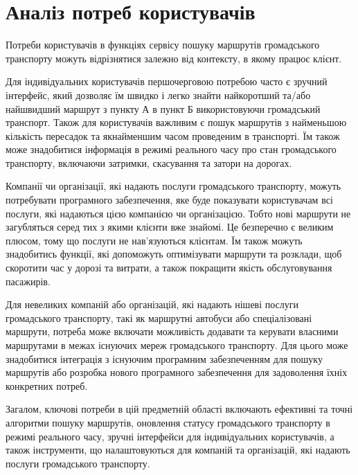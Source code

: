 \section{Аналіз потреб користувачів}
\label{sec:clients-analysis}

Потреби користувачів в функціях сервісу пошуку маршрутів громадського 
транспорту можуть відрізнятися залежно від контексту, в якому працює 
клієнт.

Для індивідуальних користувачів першочерговою потребою часто є зручний 
інтерфейс, який дозволяє їм швидко і легко знайти найкоротший та/або 
найшвидший маршрут з пункту А в пункт Б використовуючи громадський 
транспорт. Також для користувачів важливим є пошук маршрутів з 
найменьшою кількість пересадок та якнайменшим часом проведеним в 
транспорті. Їм також може знадобитися інформація в режимі реального 
часу про стан громадського транспорту, включаючи затримки, скасування 
та затори на дорогах.

Компанії чи організації, які надають послуги громадського транспорту, 
можуть потребувати програмного забезпечення, яке буде показувати 
користувачам всі послуги, які надаються цією компанією чи 
організацією. Тобто нові маршрути не загубляться серед тих з якими 
клієнти вже знайомі. Це безперечно є великим плюсом, тому що послуги 
не нав'язуються клієнтам. Їм також можуть знадобитись функції, які 
допоможуть оптимізувати маршрути та розклади, щоб скоротити час у 
дорозі та витрати, а також покращити якість обслуговування пасажирів.

Для невеликих компаній або організацій, які надають нішеві послуги 
громадського транспорту, такі як маршрутні автобуси або спеціалізовані 
маршрути, потреба може включати можливість додавати та керувати 
власними маршрутами в межах існуючих мереж громадського транспорту. 
Для цього може знадобитися інтеграція з існуючим програмним 
забезпеченням для пошуку маршрутів або розробка нового програмного 
забезпечення для задоволення їхніх конкретних потреб.

Загалом, ключові потреби в цій предметній області включають ефективні 
та точні алгоритми пошуку маршрутів, оновлення статусу громадського 
транспорту в режимі реального часу, зручні інтерфейси для 
індивідуальних користувачів, а також інструменти, що налаштовуються 
для компаній та організацій, які надають послуги громадського 
транспорту.


